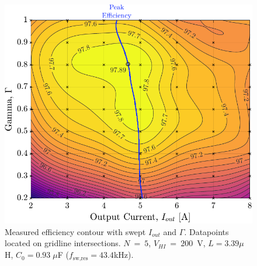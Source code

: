 \begin{figure}[t]
\begin{minipage}[H]{0.3\linewidth}
\end{minipage}
\hfill
\hspace{5pt}
\begin{minipage}[H]{0.35\linewidth}
    \centering
    \vspace{8pt}
    \includegraphics[width=1\linewidth]{Figures/3D_MeasEfficiency_1b.pdf}
    \caption{Measured efficiency contour with swept $I_{out}$ and $\Gamma$. Datapoints located on gridline intersections. $N~=~5$, $V_{HI}~=~200$~V, $L=3.39$\;$\mu$H, $C_0=0.93\;\mu$F ($f_{\textrm{sw},\textrm{res}}=43.4$\;kHz). }
    \label{fig:eff}
\end{minipage}
\vspace{-10pt}
\end{figure}
